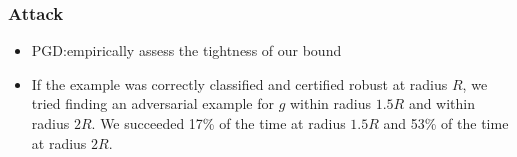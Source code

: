 \documentclass[aspectratio=169%
,serif,mathserif]{beamer}
\begin{document}
\begin{frame}
	\frametitle{Attack}
	\begin{itemize}
		\item PGD:empirically assess the tightness of our bound 
		\item If the example was correctly classified and certified robust at radius $R$, 
		we tried finding an adversarial example for $g$ within radius $1.5R$ and 
		within radius $2R$. We succeeded 17\% of the time at radius $1.5R$ and 53\% 
		of the time at radius $2R$.
	\end{itemize}	
\end{frame}








\begin{frame}
\hfill
{}
\linespread{3}\selectfont
\end{frame}
\end{document}
